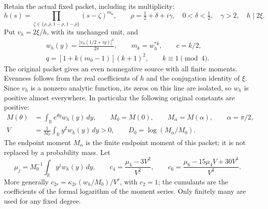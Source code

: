Retain the actual fixed packet, including its multiplicity:
\[
 h(s)=\prod_{\zeta\in\{\rho,\bar\rho,1-\rho,1-\bar\rho\}}
       (s-\zeta)^{m_0},\qquad
 \rho=\tfrac12+\delta+i\gamma,\quad
 0<\delta<\tfrac12,\quad\gamma>2,\quad h\mid2\xi.
\]
Put \(v_h=2\xi/h\), with its unchanged unit, and
\[
\begin{gathered}
 w_h(y)=\frac{|v_h(1/2+iy)|^2}{2\pi},\qquad
 m_k=w_h^{*k},\qquad c=k/2,\\
 q=[1+k(m_0-1)](k+1)^2,\qquad k\equiv1\pmod4.
\end{gathered}
\]
The original packet gives an even nonnegative source with all finite moments.
Evenness follows from the real coefficients of \(h\) and the conjugation
identity of \(\xi\). Since \(v_h\) is a nonzero analytic function, its
zeros on this line are isolated, so \(w_h\) is positive almost everywhere.
In particular the following original constants are positive:
\begin{equation}
 \begin{split}
 M(\theta)&=\int_{\mathbb R}e^{\theta y}w_h(y)\,dy,\qquad
 M_0=M(0),\qquad M_\alpha=M(\alpha),\qquad \alpha=\pi/2,\\
 V&=\frac1{M_0}\int_{\mathbb R}y^2w_h(y)\,dy>0,\qquad
 D_0=\log(M_\alpha/M_0).
 \end{split}
 \tag{FCD1}\label{a02gmf:eq:FCD1}
\end{equation}
The endpoint moment \(M_\alpha\) is the finite endpoint moment of this
packet; it is not replaced by a probability mass. Let
\[
 \mu_j=M_0^{-1}\int_{\mathbb R}y^jw_h(y)\,dy,\qquad
 c_4=\frac{\mu_4-3V^2}{V^2},\qquad
 c_6=\frac{\mu_6-15\mu_4V+30V^3}{V^3}.
\]
More generally \(c_{2r}=\kappa_{2r}(w_h/M_0)/V^r\), with \(c_2=1\);
the cumulants are the coefficients of the formal logarithm of the moment
series. Only finitely many are used for any fixed degree.

